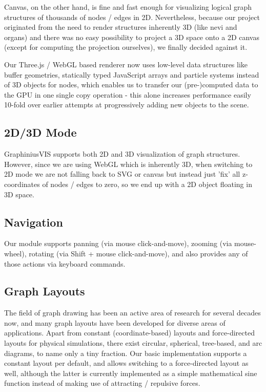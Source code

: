 	Canvas, on the other hand, is fine and fast enough for visualizing logical graph structures of thousands of nodes / edges in 2D. Nevertheless, because our project originated from the need to render structures  inherently 3D (like nevi and organs) and there was no easy possibility to project a 3D space onto a 2D canvas (except for computing the projection ourselves), we finally decided against it.
	
	Our Three.js / WebGL based renderer now uses low-level data structures like buffer geometries, statically typed JavaScript arrays and particle systems instead of 3D objects for nodes, which enables us to transfer our (pre-)computed data to the GPU in one single copy operation - this alone increases performance easily 10-fold over earlier attempts at progressively adding new objects to the scene.
	
	\subsection{2D/3D Mode}
	\label{ssect:vis_2d3d}
	
	GraphiniusVIS supports both 2D and 3D visualization of graph structures. However, since we are using WebGL which is inherently 3D, when switching to 2D mode we are not falling back to SVG or canvas but instead just 'fix' all z-coordinates of nodes / edges to zero, so we end up with a 2D object floating in 3D space.
	
	\subsection{Navigation}
	\label{ssect:vis_navigation}
	
	Our module supports panning (via mouse click-and-move), zooming (via mouse-wheel), rotating (via Shift + mouse click-and-move), and also provides any of those actions via keyboard commands.
	
	\subsection{Graph Layouts}
	\label{ssect:vis_layouts}
	
	The field of graph drawing has been an active area of research for several decades now, and many graph layouts have been developed for diverse areas of applications. Apart from constant (coordinate-based) layouts and force-directed layouts for physical simulations, there exist circular, spherical, tree-based, and arc diagrams, to name only a tiny fraction. Our basic implementation supports a constant layout per default, and allows switching to a force-directed layout as well, although the latter is currently implemented as a simple mathematical sine function instead of making use of attracting / repulsive forces.
	
